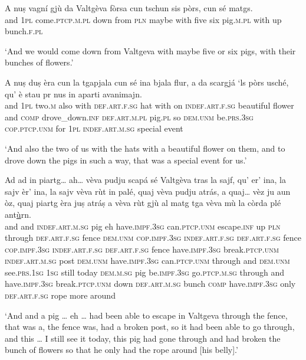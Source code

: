 \begin{linenumbers}
	\gll   A nuṣ vagní gjù da Valtgèva fòrsa cun tschun sis pòrs, cun sé matgs. \\
	and \textsc{1pl}  come.\textsc{ptcp.m.pl} down from  \textsc{pln} maybe with five six  pig.\textsc{m.pl} with up bunch.\textsc{f.pl}\\
\end{linenumbers}
\medskip
\glt `And we would come down from Valtgeva with maybe five or six pigs, with their bunches of flowers.'
\medskip

\begin{linenumbers}
	\gll    A nuṣ duṣ èra cun la tgapjala cun sé ina bjala flur, a da scargjá\footnotemark{} `ls pòrs usché, qu’ è stau pr nus in aparti avanimajn.\\
	and \textsc{1pl} two.\textsc{m} also with \textsc{def.art.f.sg} hat with on \textsc{indef.art.f.sg} beautiful flower and \textsc{comp} drove\_down.\textsc{inf}  \textsc{def.art.m.pl} pig.\textsc{pl} so \textsc{dem.unm} be.\textsc{prs.3sg} \textsc{cop.ptcp.unm} for \textsc{1pl} \textsc{indef.art.m.sg} special event\\
\end{linenumbers}
\medskip
\glt `And also the two of us with the hats with a beautiful flower on them, and to drove down the pigs in such a way, that was a special event for us.'
\medskip

\begin{linenumbers}
	\gll    Ad ad in piartg… ah… vèva pudju scapá sé Valtgèva tras la sajf, qu’ er’ ina, la sajv èr' ina, la sajv vèva rùt in palé, quaj vèva pudju atrás, a quaj… vèz ju aun òz, quaj piartg èra juṣ atráṣ a vèva rùt gjù al matg tga vèva mù la còrda plé ant\underline{ù}rn.\\
	and and \textsc{indef.art.m.sg} pig eh  have.\textsc{impf.3sg} can.\textsc{ptcp.unm} escape.\textsc{inf} up \textsc{pln} through \textsc{def.art.f.sg} fence \textsc{dem.unm} \textsc{cop.impf.3sg} \textsc{indef.art.f.sg} \textsc{def.art.f.sg} fence \textsc{cop.impf.3sg} \textsc{indef.art.f.sg} \textsc{def.art.f.sg} fence  have.\textsc{impf.3sg} break.\textsc{ptcp.unm}  \textsc{indef.art.m.sg} post \textsc{dem.unm}  have.\textsc{impf.3sg} can.\textsc{ptcp.unm} through and  \textsc{dem.unm}  see.\textsc{prs.1sg} \textsc{1sg} still today \textsc{dem.m.sg} pig be.\textsc{impf.3sg} go.\textsc{ptcp.m.sg} through and have.\textsc{impf.3sg} break.\textsc{ptcp.unm} down \textsc{def.art.m.sg} bunch  \textsc{comp} have.\textsc{impf.3sg} only \textsc{def.art.f.sg} rope more around\\
\end{linenumbers}
\medskip
\glt `And and a pig … eh … had been able to escape in Valtgeva through the fence, that was a, the fence was, had a broken post, so it had been able to go through, and this … I still see it today, this pig had gone through and had broken the bunch of flowers so that he only had the rope around [his belly].'
\medskip

